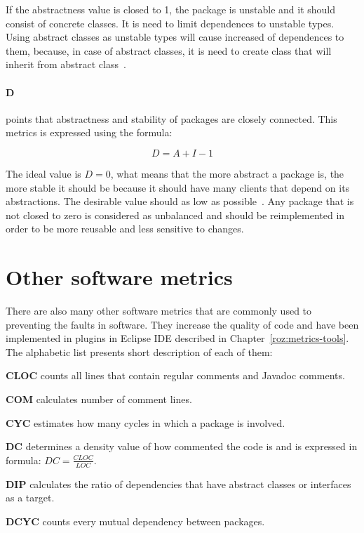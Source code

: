 If the abstractness value is closed to 1, the package is unstable and it should consist of concrete classes. It is need to limit dependences to unstable types. Using abstract classes as unstable types will cause increased of dependences to them, because, in case of abstract classes, it is need to create class that will inherit from abstract class~\cite{martin}.


\paragraph{\ac{D}} points that abstractness and stability of packages are closely connected. This metrics is expressed using the formula:

\begin{equation}
D = A + I - 1
\end{equation}

The ideal value is $D=0$, what means that the more abstract a package is, the more stable it should be because it should have many clients that depend on its abstractions. The desirable value should as low as possible~\cite{martin}. Any package that is not closed to zero is considered as unbalanced and should be reimplemented in order to be more reusable and less sensitive to changes.

\section{Other software metrics}
\label{sec:other-metrics}
There are also many other software metrics that are commonly used to preventing the faults in software. They increase the quality of code and have been implemented in plugins in Eclipse IDE described in Chapter~\ref{roz:metrics-tools}. The alphabetic list presents short description of each of them:  

\textbf{\ac{CLOC}} counts all lines that contain regular comments and Javadoc comments.

\textbf{\ac{COM}} calculates number of comment lines. 

\textbf{\ac{CYC}} estimates how many cycles in which a package is involved.

\textbf{\ac{DC}} determines a density value of how commented the code is and is expressed in formula: $DC = \frac{CLOC}{LOC}$.

\textbf{\ac{DIP}}  calculates the ratio of dependencies that have abstract classes or interfaces as a target.

\textbf{\ac{DCYC}} counts every mutual dependency between packages.

